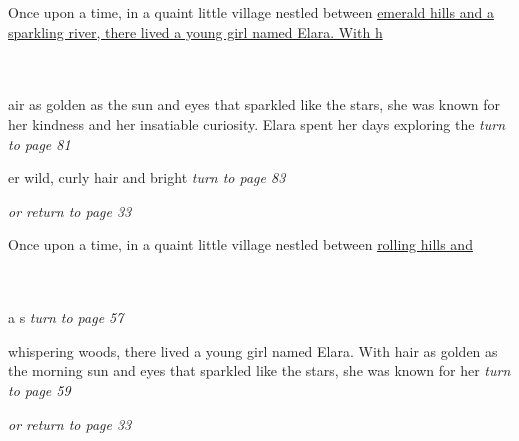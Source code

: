 \documentclass{memoir}
\begin{document}
        


        \hspace{1cm}\vfill
        \begin{minipage}{3in}
        \LARGE
        Once upon a time, in a quaint little village nestled between \ul{emerald hills and a sparkling river, there lived a young girl named Elara. With h}\\ \vspace{5mm} \\
  \\ 

        \hspace{1cm}\begin{minipage}{6cm}
        \normalsize
            air as golden as the sun and eyes that sparkled like the stars, she was known for her kindness and her insatiable curiosity. Elara spent her days exploring the \hfill \textit{turn to page 81}\\ \vspace{5mm}

er wild, curly hair and bright \hfill \textit{turn to page 83}\\ \vspace{5mm}

\hfill \textit{or return to page 33}
        \end{minipage} 
        \end{minipage}
        \hspace{1cm}\vfill
        \cleardoublepage

        


        \hspace{1cm}\vfill
        \begin{minipage}{3in}
        \LARGE
        Once upon a time, in a quaint little village nestled between \ul{rolling hills and}\\ \vspace{5mm} \\
  \\ 

        \hspace{1cm}\begin{minipage}{6cm}
        \normalsize
            a s \hfill \textit{turn to page 57}\\ \vspace{5mm}

whispering woods, there lived a young girl named Elara. With hair as golden as the morning sun and eyes that sparkled like the stars, she was known for her  \hfill \textit{turn to page 59}\\ \vspace{5mm}

\hfill \textit{or return to page 33}
        \end{minipage} 
        \end{minipage}
        \hspace{1cm}\vfill
        \cleardoublepage
\end{document}
